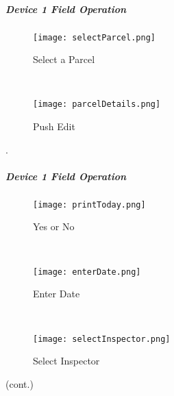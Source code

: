  \clearpage


\subparagraph{Device 1 Field Operation}

\begin{wrapfigure}{r}{0.5\textwidth}
\centering
    \texttt{[image: selectParcel.png]}
\caption {Select a Parcel}
\vspace{.25in}

\HRule \\[.4cm] %
\vspace{.25in}

\centering
    \texttt{[image: parcelDetails.png]}
\caption{Push Edit}
\end{wrapfigure}
.
\vspace{2.5in}

\vspace{4.5in}

\clearpage
\subparagraph*{Device 1 Field Operation}
\begin{wrapfigure}{r}{0.4\textwidth}
\centering
    \texttt{[image: printToday.png]}
\caption {Yes or No}
\vspace{.05in}

\HRule \\[.4cm] %
\vspace{.05in}

    \texttt{[image: enterDate.png]}
\caption{Enter Date}
\vspace{.05in}

\HRule \\[.4cm] %
\vspace{.05in}

    \texttt{[image: selectInspector.png]}
\caption{Select Inspector}
\end{wrapfigure}

{\footnotesize (cont.)}
\vspace{.8in}

\vspace{2in}

\vspace{3in}


